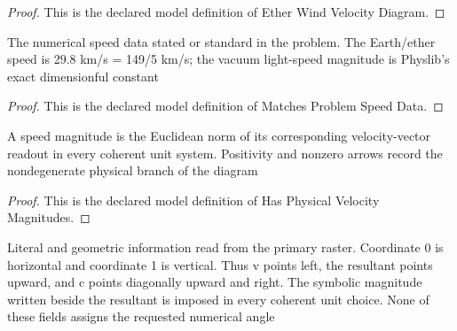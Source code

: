 \begin{proof}
  This is the declared model definition of Ether Wind Velocity Diagram.
\end{proof}
\begin{definition}
  \label{def:physics:phyx-mini-0524:phyxminiproblems-problemphyxmini0524-matchesproblemspeeddata}
  The numerical speed data stated or standard in the problem. The Earth/ether speed is 29.8 km/s = 149/5 km/s; the vacuum light-speed magnitude is Physlib's exact dimensionful constant
\end{definition}
\begin{proof}
  This is the declared model definition of Matches Problem Speed Data.
\end{proof}
\begin{definition}
  \label{def:physics:phyx-mini-0524:phyxminiproblems-problemphyxmini0524-hasphysicalvelocitymagnitudes}
  A speed magnitude is the Euclidean norm of its corresponding velocity-vector readout in every coherent unit system. Positivity and nonzero arrows record the nondegenerate physical branch of the diagram
\end{definition}
\begin{proof}
  This is the declared model definition of Has Physical Velocity Magnitudes.
\end{proof}
\begin{definition}
  \label{def:physics:phyx-mini-0524:phyxminiproblems-problemphyxmini0524-matchessuppliedetherwindfigure}
  Literal and geometric information read from the primary raster. Coordinate 0 is horizontal and coordinate 1 is vertical. Thus v points left, the resultant points upward, and c points diagonally upward and right. The symbolic magnitude written beside the resultant is imposed in every coherent unit choice. None of these fields assigns the requested numerical angle
\end{definition}
